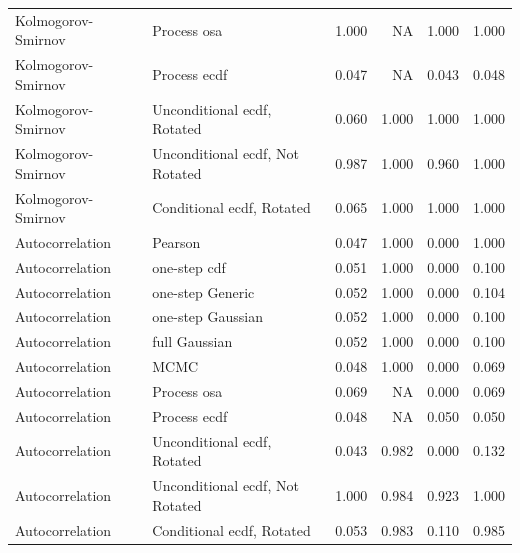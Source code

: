 \documentclass[
]{article}
\begin{document}
\begin{table}[H]
\begin{tabular}[t]{llrrrr}
Kolmogorov- Smirnov & Process osa & 1.000 & NA & 1.000 & 1.000\\
Kolmogorov- Smirnov & Process ecdf & 0.047 & NA & 0.043 & 0.048\\
Kolmogorov- Smirnov & Unconditional ecdf, Rotated & 0.060 & 1.000 & 1.000 & 1.000\\
\addlinespace
Kolmogorov- Smirnov & Unconditional ecdf, Not Rotated & 0.987 & 1.000 & 0.960 & 1.000\\
Kolmogorov- Smirnov & Conditional ecdf, Rotated & 0.065 & 1.000 & 1.000 & 1.000\\
Autocorrelation & Pearson & 0.047 & 1.000 & 0.000 & 1.000\\
Autocorrelation & one-step cdf & 0.051 & 1.000 & 0.000 & 0.100\\
Autocorrelation & one-step Generic & 0.052 & 1.000 & 0.000 & 0.104\\
\addlinespace
Autocorrelation & one-step Gaussian & 0.052 & 1.000 & 0.000 & 0.100\\
Autocorrelation & full Gaussian & 0.052 & 1.000 & 0.000 & 0.100\\
Autocorrelation & MCMC & 0.048 & 1.000 & 0.000 & 0.069\\
Autocorrelation & Process osa & 0.069 & NA & 0.000 & 0.069\\
Autocorrelation & Process ecdf & 0.048 & NA & 0.050 & 0.050\\
\addlinespace
Autocorrelation & Unconditional ecdf, Rotated & 0.043 & 0.982 & 0.000 & 0.132\\
Autocorrelation & Unconditional ecdf, Not Rotated & 1.000 & 0.984 & 0.923 & 1.000\\
Autocorrelation & Conditional ecdf, Rotated & 0.053 & 0.983 & 0.110 & 0.985\\
\bottomrule
\end{tabular}
\end{table}
\end{document}

